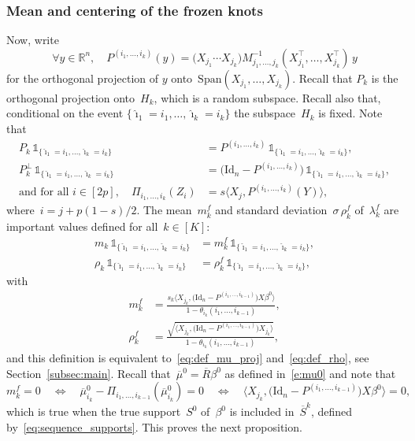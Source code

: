 \documentclass[final,numbib]{imaiai}%
\numberwithin{equation}{section}
\def\eq{\begin{equation}}
\def\qe{\end{equation}}
\renewcommand{\bar}{\overline}
\renewcommand{\hat}{\widehat}
\def\\bUnif{\text{\bUnif}}
\newcommand{\<}{\langle}
\renewcommand{\>}{\rangle}
\newcommand{\1}{\mathds{1}}
\begin{document}
{\subsubsection{Mean and centering of the frozen knots}
Now, write 
\eq
\label{e:P_seq}
\forall y\in\mathds R^n,\quad
P^{(i_1,\ldots, i_{k})}(y)=\big(X_{j_1} \cdots X_{j_{k}}  \big)M^{-1}_{j_1,\ldots, j_{k}}  (X_{j_1}^\top, \ldots, X_{j_{k}}^\top)\,y
\qe
for the orthogonal projection of $y$ onto~$\mathrm{Span}(X_{j_1} ,\ldots, X_{j_{k}} )$.
Recall that $P_k$ is the orthogonal projection onto~$H_k$, which is a random subspace.
Recall also that, conditional on the event $\{\hat \imath_1=i_1,\ldots, \hat \imath_{k}=i_k\}$ the subspace~$H_k$ is fixed. Note that 
\begin{align*}
P_k\,\mathds 1_{\{\hat \imath_1=i_1,\ldots, \hat \imath_{k}=i_k\}}&=P^{(i_1,\ldots, i_{k})}\,\mathds 1_{\{\hat \imath_1=i_1,\ldots, \hat \imath_{k}=i_k\}},\\
P^\perp_k\,\mathds 1_{\{\hat \imath_1=i_1,\ldots, \hat \imath_{k}=i_k\}}&=\big(\mathrm{Id}_n-P^{(i_1,\ldots, i_{k})}\big)\,\mathds 1_{\{\hat \imath_1=i_1,\ldots, \hat \imath_{k}=i_k\}},\\
\text{and for all }i\in [2p],\quad \Pi_{ i_1,\ldots, i_{k}} (Z_i)
&= s\langle X_j, P^{(i_1,\ldots, i_{k})}(Y)\rangle,
\end{align*}
where~$i=j+p({1-s})/2$.
The mean~$m^f_k$ and standard deviation~$\sigma\,\rho^f_k$ of~$\lambda^f_k$ are important values defined for all~$k\in[K]$:
\begin{align*}
m_{k}\,\mathds 1_{\{\hat \imath_1=i_1,\ldots, \hat \imath_{k}=i_k\}}&
=m_{k}^f\,\mathds 1_{\{\hat \imath_1=i_1,\ldots, \hat \imath_{k}=i_k\}},
\\
\rho_{k}\,\mathds 1_{\{\hat \imath_1=i_1,\ldots, \hat \imath_{k}=i_k\}}&=\rho_{k}^{f}\,\mathds 1_{\{\hat \imath_1=i_1,\ldots, \hat \imath_{k}=i_k\}},
\end{align*}
with 
\begin{align}
\label{e:frozen_m}
m_{k}^f
&=
\frac{
s_k\langle X_{j_k},\big(\mathrm{Id}_n-P^{(i_1,\ldots, i_{k-1})}\big)X\beta^0\rangle
}{1-\theta_{i_{k}}(i_1,\ldots,i_{k-1})},
\\
\label{e:frozen_rho}
\rho_{k}^{f}
&=
\frac{
\sqrt{
\langle X_{j_k},\big(\mathrm{Id}_n-P^{(i_1,\ldots, i_{k-1})}\big)X_{j_k}\rangle
}}{1-\theta_{i_{k}}(i_1,\ldots,i_{k-1})},
\end{align}
and this definition is equivalent to~\eqref{eq:def_mu_proj} and~\eqref{eq:def_rho}, see Section~\ref{subsec:main}.
Recall that~$\bar\mu^0=\bar R\beta^0$ as defined in~\eqref{e:mu0} and note that
\eq
\label{e:meanH0}
m^f_k=0
\quad\Leftrightarrow\quad 
\bar\mu^0_{i_k}-\Pi_{ i_1,\ldots, i_{k-1}} (\bar\mu^0_{i_k})=0
\quad\Leftrightarrow\quad 
\langle X_{j_k},\big(\mathrm{Id}_n-P^{(i_1,\ldots, i_{k-1})}\big)X\beta^0\rangle=0,
\qe
which is true when the true support~$S^0$ of~$\beta^0$ is included in~$\bar S^k$, defined by~\eqref{eq:sequence_supports}.
 This proves the next proposition.

}
\end{document}
